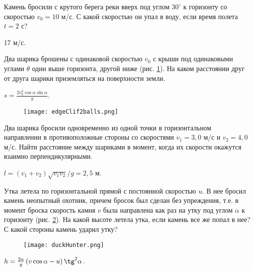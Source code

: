 \begin{ex} %
Камень бросили с крутого берега реки вверх под углом $30^{\circ}$ к горизонту со скоростью $v_0 = 10$ м/с. С какой скоростью он упал в воду, если время полета $t = 2$ с?
\begin{ans}
17 м/с.
\end{ans}
\end{ex}	

\begin{ex} %
Два шарика брошены с одинаковой скоростью $v_0$ с крыши под одинаковыми углами  $\theta$ один выше горизонта, другой ниже (рис. \ref{edgeClif2balls}). На каком расстоянии друг от друга шарики приземляться на поверхности земли.
\begin{ans}
$s = \frac{2 v_0^2 \cos \alpha \sin \alpha}{g}$.
\end{ans}
\end{ex}

\begin{figure}
\centering
\texttt{[image: edgeClif2balls.png]}
\caption{}
\label{edgeClif2balls}
\end{figure}

\complexProblems

\begin{ex} %
Два шарика бросили одновременно из одной точки в горизонтальном направлении в противоположные стороны со скоростями $v_1 = 3,0$ м/с и $v_2 = 4,0$ м/с. Найти расстояние между шариками в момент, когда их скорости окажутся взаимно перпендикулярными.
\begin{ans}
$l = (v_1 + v_2)\sqrt{v_1 v_2}/g = 2,5$ м.
\end{ans}
\end{ex}	

\begin{ex} %
Утка летела по горизонтальной прямой с постоянной скоростью $u$. В нее бросил камень неопытный охотник, причем бросок был сделан без упреждения, т.е. в момент броска скорость камня $v$ была направлена как раз на утку под углом $\alpha$ к горизонту (рис. \ref{duckHunter}). На какой высоте летела утка, если камень все же попал в нее? С какой стороны камень ударил утку?

\begin{figure}
\centering
\texttt{[image: duckHunter.png]}
\caption{}
\label{duckHunter}
\end{figure}

\begin{ans}
$h = \frac{2u}{g}\left( v \cos \alpha - u \right) \tg^2 \alpha$.
\end{ans}
\end{ex}

